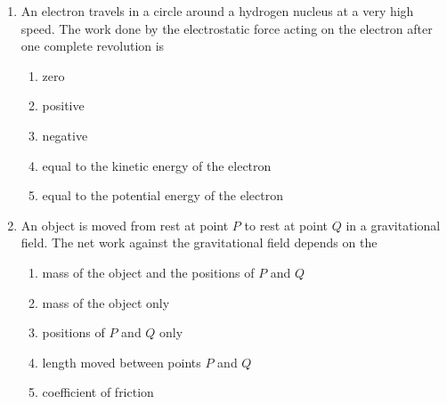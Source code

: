 \documentclass{../../../oss-classkick}
\begin{document}
\begin{multicols}{2}
\begin{enumerate}[leftmargin=18pt,resume]
  \item An electron travels in a circle around a hydrogen nucleus at a very high
    speed. The work done by the electrostatic force acting on the electron
    after one complete revolution is
    \begin{enumerate}[nosep,label=(\Alph*)]
    \item zero
    \item positive
    \item negative
    \item equal to the kinetic energy of the electron
    \item equal to the potential energy of the electron
    \end{enumerate}
    \columnbreak
    
  \item An object is moved from rest at point $P$ to rest at point $Q$ in a
    gravitational field. The net work against the gravitational field depends
    on the
    \begin{enumerate}[nosep,label=(\Alph*)]
    \item mass of the object and the positions of $P$ and $Q$
    \item mass of the object only
    \item positions of $P$ and $Q$ only
    \item length moved between points $P$ and $Q$
    \item coefficient of friction
    \end{enumerate}
    \vspace{.8in}
%  

\end{enumerate}
\end{multicols}
\end{document}
